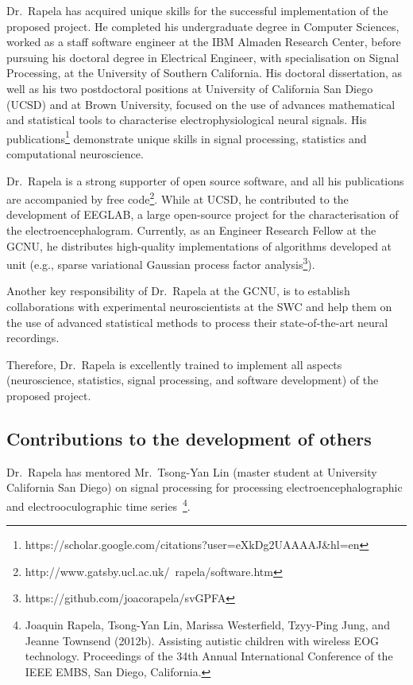 Dr.~Rapela has acquired unique skills for the successful implementation of the
proposed project. He completed his undergraduate degree in Computer Sciences,
worked as a staff software engineer at the IBM Almaden Research Center, before
pursuing his doctoral degree in Electrical Engineer, with specialisation on
Signal Processing, at the University of Southern California.  His doctoral
dissertation, as well as his two postdoctoral positions at University of
California San Diego (UCSD) and at Brown University, focused on the use of
advances mathematical and statistical tools to characterise
electrophysiological neural signals. His
publications\footnote{https://scholar.google.com/citations?user=eXkDg2UAAAAJ\&hl=en}
demonstrate unique skills in signal processing, statistics and computational
neuroscience.

Dr.~Rapela is a strong supporter of open source software, and all his
publications are accompanied by free
code\footnote{http://www.gatsby.ucl.ac.uk/~rapela/software.htm}. While at UCSD,
he contributed to the development of EEGLAB, a large open-source project for
the characterisation of the electroencephalogram. Currently, as an Engineer
Research Fellow at the GCNU, he distributes high-quality implementations of
algorithms developed at unit (e.g., sparse variational Gaussian process factor
analysis\footnote{https://github.com/joacorapela/svGPFA}).

Another key responsibility of Dr.~Rapela at the GCNU, is to establish
collaborations with experimental neuroscientists at the SWC and help them on
the use of advanced statistical methods to process their state-of-the-art
neural recordings.

Therefore, Dr.~Rapela is excellently trained to implement all aspects
(neuroscience, statistics, signal processing, and software development) of the
proposed project.


\subsection{Contributions to the development of others}

Dr.~Rapela has mentored Mr.~Tsong-Yan Lin (master student at University
California San Diego) on signal processing for processing
electroencephalographic and electrooculographic time
series~\footnote{Joaquin Rapela, Tsong-Yan Lin, Marissa Westerfield, Tzyy-Ping
Jung, and Jeanne Townsend (2012b). Assisting autistic children with wireless
EOG technology. Proceedings of the 34th Annual International Conference of the
IEEE EMBS, San Diego, California.}.

